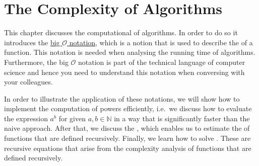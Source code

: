 \chapter{The Complexity of Algorithms} 
This chapter discusses the computational  of algorithms.  In order to do so it introduces the
\href{http://en.wikipedia.org/wiki/O_notation}{big $\mathcal{O}$ notation}, which is a notion that is used to
describe the  of a function.  
This  notation is needed when analysing the running time of algorithms.  Furthermore, the big $\mathcal{O}$
notation is part of the technical language of computer science and hence you need to understand this notation
when conversing with your colleagues.

In order to illustrate the application of these notations, we will show how to implement the computation of
powers efficiently, i.e.~we discuss how to evaluate the expression $a^b$ for given $a,b \in \mathbb{N}$ in a way that
is significantly faster than the naive approach.  After that, we discuss the , which
enables us to estimate the  of functions that are defined recursively.  Finally, we learn how to solve
.  These are recursive equations that arise from the complexity analysis of
functions that are defined recursively.

